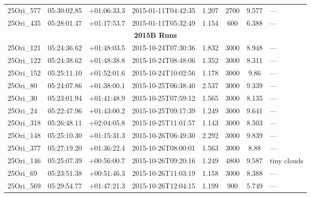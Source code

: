 \documentclass[12pt]{article}
\begin{document}
\begin{table}
\begin{center}
\begin{threeparttable}
\begin{tabular}{lccccccl}
	25Ori\_577    & 05:30:02.85 & +01:06:33.3 & 2015-01-11T04:42:35  & 1.207         & 2700             & 9.577  & ---                      \\
	25Ori\_435    & 05:28:01.47 & +01:17:53.7 & 2015-01-11T05:32:49  & 1.154         & 600              & 6.388  & ---                      \\
	\multicolumn{8}{c}{{\bf 2015B Runs}} \\
	25Ori\_121    & 05:24:36.62 & +01:48:03.5 & 2015-10-24T07:30:36  & 1.832         & 3000             & 8.948  & ---                      \\
	25Ori\_122    & 05:24:38.62 & +01:48:38.8 & 2015-10-24T08:48:06  & 1.352         & 3000             & 8.311  & ---                      \\
	25Ori\_152    & 05:25:11.10 & +01:52:01.6 & 2015-10-24T10:02:56  & 1.178         & 3000             & 9.86   & ---                      \\
	25Ori\_80     & 05:24:07.86 & +01:38:00.1 & 2015-10-25T06:38:40  & 2.537         & 3000             & 9.339  & ---                      \\
	25Ori\_30     & 05:23:01.94 & +01:41:48.9 & 2015-10-25T07:59:12  & 1.565         & 3000             & 8.135  & ---                      \\
	25Ori\_24     & 05:22:47.96 & +01:43:00.2 & 2015-10-25T09:17:39  & 1.249         & 3000             & 9.641  & ---                      \\
	25Ori\_318    & 05:26:48.11 & +02:04:05.8 & 2015-10-25T11:01:57  & 1.143         & 3000             & 8.503  & ---                      \\
	25Ori\_148    & 05:25:10.30 & +01:15:31.3 & 2015-10-26T06:49:30  & 2.292         & 3000             & 9.839  & ---                      \\
	25Ori\_377    & 05:27:19.20 & +01:36:22.4 & 2015-10-26T08:00:01  & 1.563         & 3000             & 8.88   & ---                      \\
	25Ori\_146    & 05:25:07.39 & +00:56:00.7 & 2015-10-26T09:20:16  & 1.249         & 4800             & 9.587  & tiny clouds              \\
	25Ori\_69     & 05:23:51.38 & +00:51:46.3 & 2015-10-26T11:03:19  & 1.158         & 3000             & 8.388  & ---                      \\
	25Ori\_569    & 05:29:54.77 & +01:47:21.3 & 2015-10-26T12:04:15  & 1.199         & 900              & 5.749  & ---                      \\

\end{tabular}
\end{threeparttable}
\end{center}
\end{table}
\end{document}
